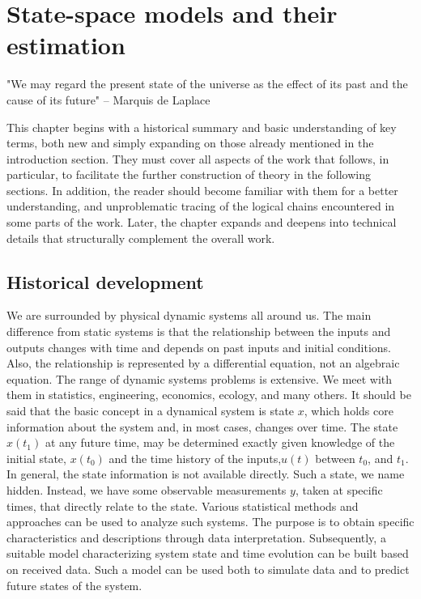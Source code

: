 \chapter{State-space models and their estimation}
\label{chap:ssm_and_estimation}

\begin{chapterabstract}
"We may regard the present state of the universe as the effect of its past and the cause of its future" – Marquis de Laplace
\end{chapterabstract}

This chapter begins with a historical summary and basic understanding of key terms, both new and simply expanding on those already mentioned in the introduction section.
They must cover all aspects of the work that follows, in particular, to facilitate the further construction of theory in the following sections. In addition, the reader should become familiar with them for a better understanding, and unproblematic tracing of the logical chains encountered in some parts of the work. Later, the chapter expands and deepens into technical details that structurally complement the overall work.

\section{Historical development}

We are surrounded by physical dynamic systems all around us. The main difference from static systems is that the relationship between the inputs and outputs changes with time and depends on past inputs and initial conditions. Also, the relationship is represented by a differential equation, not an algebraic equation. The range of dynamic systems problems is extensive. We meet with them in statistics, engineering, economics, ecology, and many others.
It should be said that the basic concept in a dynamical system is state \(x\), which holds core information about the system and, in most cases, changes over time. The state \(x(t_1)\) at any future time, may be determined exactly given knowledge of the initial state, \(x(t_0)\) and the time history of the inputs,\(u(t)\) between \(t_0\), and \(t_1\). In general, the state information is not available directly. Such a state, we name hidden. Instead, we have some observable measurements \(y\), taken at specific times, that directly relate to the state.
Various statistical methods and approaches can be used to analyze such systems. The purpose is to obtain specific characteristics and descriptions through data interpretation. Subsequently, a suitable model characterizing system state and time evolution can be built based on received data. Such a model can be used both to simulate data and to predict future states of the system.

